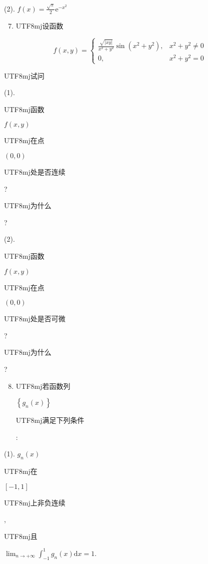 \documentclass[10pt]{article}
\begin{document}
(2). $f(x)=\frac{\sqrt{\pi}}{2} \mathrm{e}^{-x^{2}}$

\begin{enumerate}
  \setcounter{enumi}{6}
  \item \begin{CJK}{UTF8}{mj}设函数\end{CJK}
\end{enumerate}
$$
f(x, y)= \begin{cases}\frac{\sqrt{|x y|}}{x^{2}+y^{2}} \sin \left(x^{2}+y^{2}\right), & x^{2}+y^{2} \neq 0 \\ 0, & x^{2}+y^{2}=0\end{cases}
$$
\begin{CJK}{UTF8}{mj}试问\end{CJK}

(1). \begin{CJK}{UTF8}{mj}函数\end{CJK} $f(x, y)$ \begin{CJK}{UTF8}{mj}在点\end{CJK} $(0,0)$ \begin{CJK}{UTF8}{mj}处是否连续\end{CJK}? \begin{CJK}{UTF8}{mj}为什么\end{CJK}?

(2). \begin{CJK}{UTF8}{mj}函数\end{CJK} $f(x, y)$ \begin{CJK}{UTF8}{mj}在点\end{CJK} $(0,0)$ \begin{CJK}{UTF8}{mj}处是否可微\end{CJK}? \begin{CJK}{UTF8}{mj}为什么\end{CJK}?

\begin{enumerate}
  \setcounter{enumi}{7}
  \item \begin{CJK}{UTF8}{mj}若函数列\end{CJK} $\left\{g_{n}(x)\right\}$ \begin{CJK}{UTF8}{mj}满足下列条件\end{CJK}:
\end{enumerate}
(1). $g_{n}(x)$ \begin{CJK}{UTF8}{mj}在\end{CJK} $[-1,1]$ \begin{CJK}{UTF8}{mj}上非负连续\end{CJK}, \begin{CJK}{UTF8}{mj}且\end{CJK} $\lim _{n \rightarrow+\infty} \int_{-1}^{1} g_{n}(x) \mathrm{d} x=1$.
\end{document}
